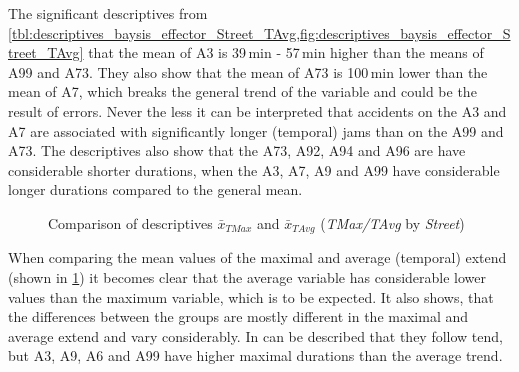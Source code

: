 The significant descriptives from \cref{tbl:descriptives_baysis_effector_Street_TAvg,fig:descriptives_baysis_effector_Street_TAvg} that the mean of A3 is 39\,min - 57\,min higher than the means of A99 and A73. They also show that the mean of A73 is 100\,min lower than the mean of A7, which breaks the general trend of the variable and could be the result of errors. Never the less it can be interpreted that accidents on the A3 and A7 are associated with significantly longer (temporal) jams than on the A99 and A73. The descriptives also show that the A73, A92, A94 and A96 are have considerable shorter durations, when the A3, A7, A9 and A99 have considerable longer durations compared to the general mean.
\begin{figure}[ht!]
	\data 
	\pgfplotstablesort[sort key=meanTAvg, sort cmp=float >]{\datasorted}{\data}
	\tiny
	\centering
	\caption{Comparison of descriptives $\bar{x}_{TMax}$ and $\bar{x}_{TAvg}$ (\textit{TMax/TAvg} by \textit{Street})}
	\label{fig:baysis_effector_meancomparison_Str_temporal}
\end{figure}
When comparing the mean values of the maximal and average (temporal) extend (shown in \cref{fig:baysis_effector_meancomparison_Str_temporal}) it becomes clear that the average variable has considerable lower values than the maximum variable, which is to be expected. It also shows, that the differences between the groups are mostly different in the maximal and average extend and vary considerably. In can be described that they follow tend, but A3, A9, A6 and A99 have higher maximal durations than the average trend.


